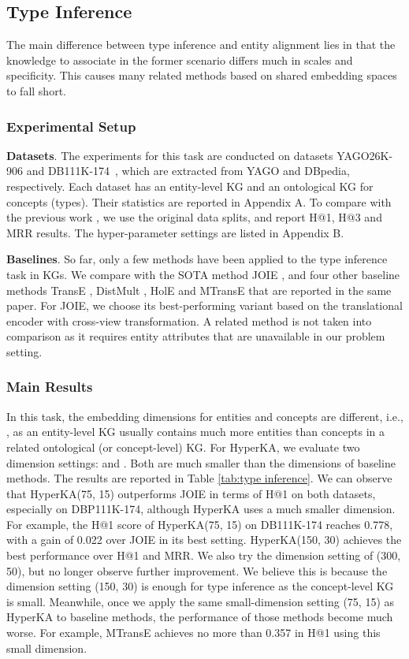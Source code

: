 \documentclass[11pt,a4paper]{article}
\newcommand{\modelname}{HyperKA\xspace}
\begin{document}
\subsection{Type Inference}
\label{subsect:ti}
The main difference between type inference and entity alignment lies in that the knowledge to associate in the former scenario differs much in scales and specificity. This causes many related methods based on shared embedding spaces to fall short. 

\subsubsection{Experimental Setup}
\noindent \textbf{Datasets}.
The experiments for this task are conducted on datasets YAGO26K-906 and DB111K-174~\cite{JOIE}, which are extracted from YAGO and DBpedia, respectively. Each dataset has an entity-level KG and an ontological KG for concepts (types). Their statistics are reported in Appendix A. To compare with the previous work \cite{JOIE}, we use the original data splits, and report H@1, H@3 and MRR results. The hyper-parameter settings are listed in Appendix B.



\noindent \textbf{Baselines}.
So far, only a few methods have been applied to the type inference task in KGs. We compare with the SOTA method JOIE \cite{JOIE}, and four other baseline methods TransE \cite{TransE}, DistMult \cite{DistMult}, HolE \cite{HolE} and MTransE \cite{MTransE} that are reported in the same paper. For JOIE, we choose its best-performing variant based on the translational encoder with cross-view transformation. A related method \cite{Entity_Typing} is not taken into comparison as it requires entity attributes that are unavailable in our problem setting.



\subsubsection{Main Results}
In this task, the embedding dimensions for entities and concepts are different, i.e., , as an entity-level KG usually contains much more entities than concepts in a related ontological (or concept-level) KG. For \modelname, we evaluate two dimension settings:  and . Both are much smaller than the dimensions of baseline methods. The results are reported in Table \ref{tab:type inference}. We can observe that \modelname (75, 15) outperforms JOIE in terms of H@1 on both datasets, especially on DBP111K-174, although \modelname uses a much smaller dimension. For example, the H@1 score of \modelname (75, 15) on DB111K-174 reaches 0.778, with a gain of 0.022 over JOIE in its best setting. \modelname (150, 30) achieves the best performance over H@1 and MRR. We also try the dimension setting of (300, 50), but no longer observe further improvement. We believe this is because the dimension setting (150, 30) is enough for type inference as the concept-level KG is small. Meanwhile, once we apply the same small-dimension setting (75, 15) as \modelname to baseline methods, the performance of those methods become much worse. For example, MTransE achieves no more than 0.357 in H@1 using this small dimension.
\end{document}
